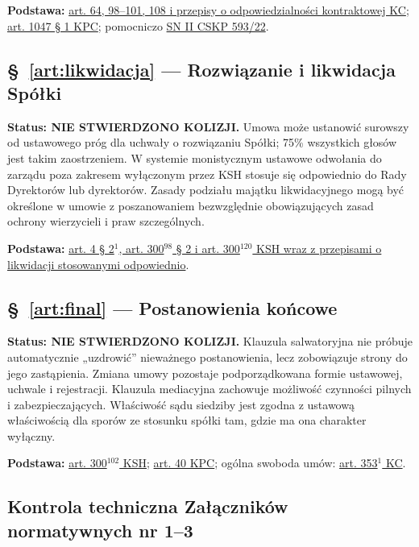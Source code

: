 \documentclass[12pt,a4paper]{report}
\begin{document}
\textbf{Podstawa:} \href{https://eli.gov.pl/eli/DU/2026/795/ogl}{art. 64, 98--101, 108 i przepisy o odpowiedzialności kontraktowej KC}; \href{https://eli.gov.pl/eli/DU/2026/468/ogl}{art. 1047 § 1 KPC}; pomocniczo \href{https://www.sn.pl/sites/orzecznictwo/OrzeczeniaHTML/ii%20cskp%20593-22.docx.html}{SN II CSKP 593/22}.

\subsection*{§~\ref{art:likwidacja} — Rozwiązanie i likwidacja Spółki}
\textbf{Status: NIE STWIERDZONO KOLIZJI.} Umowa może ustanowić surowszy od ustawowego próg dla uchwały o rozwiązaniu Spółki; 75\% wszystkich głosów jest takim zaostrzeniem. W systemie monistycznym ustawowe odwołania do zarządu poza zakresem wyłączonym przez KSH stosuje się odpowiednio do Rady Dyrektorów lub dyrektorów. Zasady podziału majątku likwidacyjnego mogą być określone w umowie z poszanowaniem bezwzględnie obowiązujących zasad ochrony wierzycieli i praw szczególnych.

\textbf{Podstawa:} \href{https://eli.gov.pl/api/acts/DU/2024/18/text.html}{art. 4 § 2$^{1}$, art. 300$^{98}$ § 2 i art. 300$^{120}$ KSH wraz z przepisami o likwidacji stosowanymi odpowiednio}.

\subsection*{§~\ref{art:final} — Postanowienia końcowe}
\textbf{Status: NIE STWIERDZONO KOLIZJI.} Klauzula salwatoryjna nie próbuje automatycznie „uzdrowić” nieważnego postanowienia, lecz zobowiązuje strony do jego zastąpienia. Zmiana umowy pozostaje podporządkowana formie ustawowej, uchwale i rejestracji. Klauzula mediacyjna zachowuje możliwość czynności pilnych i zabezpieczających. Właściwość sądu siedziby jest zgodna z ustawową właściwością dla sporów ze stosunku spółki tam, gdzie ma ona charakter wyłączny.

\textbf{Podstawa:} \href{https://eli.gov.pl/api/acts/DU/2024/18/text.html}{art. 300$^{102}$ KSH}; \href{https://eli.gov.pl/eli/DU/2026/468/ogl}{art. 40 KPC}; ogólna swoboda umów: \href{https://eli.gov.pl/eli/DU/2026/795/ogl}{art. 353$^{1}$ KC}.

\subsection*{Kontrola techniczna Załączników normatywnych nr 1--3}
\end{document}
